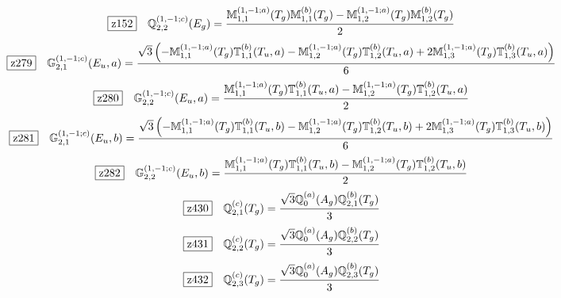\documentclass[fleqn,10pt,landscape]{jsarticle}
\begin{document}
\begin{dmath*}
\hspace*{3mm}\fbox{z152}\quad \mathbb{Q}_{2,2}^{(1,-1;c)}(E_{g})=\frac{\mathbb{M}_{1,1}^{(1,-1;a)}(T_{g}) \mathbb{M}_{1,1}^{(b)}(T_{g}) - \mathbb{M}_{1,2}^{(1,-1;a)}(T_{g}) \mathbb{M}_{1,2}^{(b)}(T_{g})}{2}
\end{dmath*}
\begin{dmath*}
\hspace*{3mm}\fbox{z279}\quad \mathbb{G}_{2,1}^{(1,-1;c)}(E_{u},a)=\frac{\sqrt{3} \left(- \mathbb{M}_{1,1}^{(1,-1;a)}(T_{g}) \mathbb{T}_{1,1}^{(b)}(T_{u},a) - \mathbb{M}_{1,2}^{(1,-1;a)}(T_{g}) \mathbb{T}_{1,2}^{(b)}(T_{u},a) + 2 \mathbb{M}_{1,3}^{(1,-1;a)}(T_{g}) \mathbb{T}_{1,3}^{(b)}(T_{u},a)\right)}{6}
\end{dmath*}
\begin{dmath*}
\hspace*{3mm}\fbox{z280}\quad \mathbb{G}_{2,2}^{(1,-1;c)}(E_{u},a)=\frac{\mathbb{M}_{1,1}^{(1,-1;a)}(T_{g}) \mathbb{T}_{1,1}^{(b)}(T_{u},a) - \mathbb{M}_{1,2}^{(1,-1;a)}(T_{g}) \mathbb{T}_{1,2}^{(b)}(T_{u},a)}{2}
\end{dmath*}
\begin{dmath*}
\hspace*{3mm}\fbox{z281}\quad \mathbb{G}_{2,1}^{(1,-1;c)}(E_{u},b)=\frac{\sqrt{3} \left(- \mathbb{M}_{1,1}^{(1,-1;a)}(T_{g}) \mathbb{T}_{1,1}^{(b)}(T_{u},b) - \mathbb{M}_{1,2}^{(1,-1;a)}(T_{g}) \mathbb{T}_{1,2}^{(b)}(T_{u},b) + 2 \mathbb{M}_{1,3}^{(1,-1;a)}(T_{g}) \mathbb{T}_{1,3}^{(b)}(T_{u},b)\right)}{6}
\end{dmath*}
\begin{dmath*}
\hspace*{3mm}\fbox{z282}\quad \mathbb{G}_{2,2}^{(1,-1;c)}(E_{u},b)=\frac{\mathbb{M}_{1,1}^{(1,-1;a)}(T_{g}) \mathbb{T}_{1,1}^{(b)}(T_{u},b) - \mathbb{M}_{1,2}^{(1,-1;a)}(T_{g}) \mathbb{T}_{1,2}^{(b)}(T_{u},b)}{2}
\end{dmath*}
\begin{dmath*}
\hspace*{3mm}\fbox{z430}\quad \mathbb{Q}_{2,1}^{(c)}(T_{g})=\frac{\sqrt{3} \mathbb{Q}_{0}^{(a)}(A_{g}) \mathbb{Q}_{2,1}^{(b)}(T_{g})}{3}
\end{dmath*}
\begin{dmath*}
\hspace*{3mm}\fbox{z431}\quad \mathbb{Q}_{2,2}^{(c)}(T_{g})=\frac{\sqrt{3} \mathbb{Q}_{0}^{(a)}(A_{g}) \mathbb{Q}_{2,2}^{(b)}(T_{g})}{3}
\end{dmath*}
\begin{dmath*}
\hspace*{3mm}\fbox{z432}\quad \mathbb{Q}_{2,3}^{(c)}(T_{g})=\frac{\sqrt{3} \mathbb{Q}_{0}^{(a)}(A_{g}) \mathbb{Q}_{2,3}^{(b)}(T_{g})}{3}
\end{dmath*}
\end{document}
